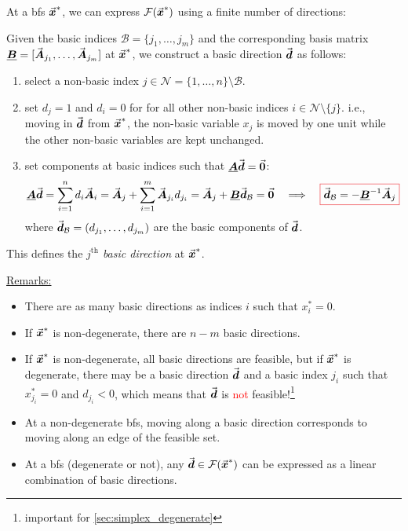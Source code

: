 At a \gls{bfs} \(\vec{\boldsymbol{x}}^\ast\), we can express \(\mathcal{F}(\vec{\boldsymbol{x}}^\ast)\) using a finite number of directions:
\begin{definition}\label{def:basic_direction}
Given the basic indices \(\mathcal{B} = \{j_1,\ldots,j_m\}\) and the corresponding basis matrix \(\underline{\boldsymbol{B}} = [\vec{\boldsymbol{A}}_{j_1},\ldots,\vec{\boldsymbol{A}}_{j_m}]\) at \(\vec{\boldsymbol{x}}^\ast\), we construct a basic direction \(\vec{\boldsymbol{d}}\) as follows:
\begin{enumerate}
\item select a non-basic index \(j \in \mathcal{N} = \{1,\ldots,n\} \setminus \mathcal{B}\).
\item set \(d_j = 1\) and \(d_i = 0\) for for all other non-basic indices \(i \in \mathcal{N} \setminus \{j\}\).
i.e., moving in \(\vec{\boldsymbol{d}}\) from \(\vec{\boldsymbol{x}}^\ast\), the non-basic variable \(x_j\) is moved by one unit while the other non-basic variables are kept unchanged.
\item set components at basic indices such that \(\underline{\boldsymbol{A}}\vec{\boldsymbol{d}} = \vec{\boldsymbol{0}}\):
\begin{equation}\label{eq:basic_direction_lp}
\matr{A}\vect{d} = \sum_{i=1}^{n} d_i \vect{A}_i = \vect{A}_j + \sum_{i =1}^{m} \vect{A}_{j_i} d_{j_i} = \vect{A}_j + \matr{B} \vect{d}_\mathcal{B} = \vect{0} 
\quad\Longrightarrow\quad 
{\color{Red}
\boxed{ 
\color{black}
\vect{d}_\mathcal{B} = -\matr{B}^{-1} \vect{A}_j
}
}
\end{equation}
where \(\vec{\boldsymbol{d}}_\mathcal{B} = (d_{j_1},\ldots,d_{j_m})\) are the basic components of \(\vec{\boldsymbol{d}}\).
\end{enumerate}
This defines the \emph{\(j^\text{th}\) basic direction} at \(\vec{\boldsymbol{x}}^\ast\).
\end{definition}
\underline{Remarks:}
\begin{itemize}
\item There are as many basic directions as indices \(i\) such that \(x_i^\ast = 0\). 
\item If \(\vec{\boldsymbol{x}}^\ast\) is non-degenerate, there are \(n - m\) basic directions.
\item If \(\vec{\boldsymbol{x}}^\ast\) is non-degenerate, all basic directions are feasible, but if \(\vec{\boldsymbol{x}}^\ast\) is degenerate, there may be a basic direction \(\vec{\boldsymbol{d}}\) and a basic index \(j_i\) such that \(x_{j_i}^\ast = 0\) and \(d_{j_i} < 0\), which means that \(\vec{\boldsymbol{d}}\) is \textcolor{red}{not} feasible!\footnote{important for \ref{sec:simplex_degenerate}} %
\item At a non-degenerate \gls{bfs}, moving along a basic direction corresponds to moving along an edge of the feasible set.
\item At a \gls{bfs} (degenerate or not), any \(\vec{\boldsymbol{d}} \in \mathcal{F}(\vec{\boldsymbol{x}}^\ast)\) can be expressed as a linear combination of basic directions.
\end{itemize}







